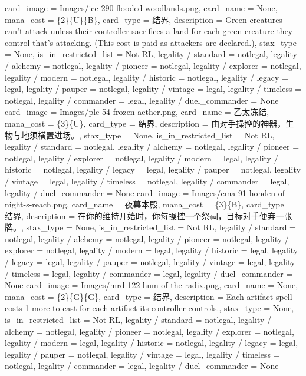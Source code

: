 \documentclass[lang = cn, color = black, 10pt]{AllThatStax}
\begin{document}
\card
{
	card_image = Images/ice-290-flooded-woodlands.png,
	card_name = None,
	mana_cost = \{2\}\{U\}\{B\},
	card_type = 结界,
	description = Green creatures can't attack unless their controller sacrifices a land for each green creature they control that's attacking. (This cost is paid as attackers are declared.),
	stax_type = None,
	is_in_restricted_list = Not RL,
	legality / standard = notlegal,
	legality / alchemy = notlegal,
	legality / pioneer = notlegal,
	legality / explorer = notlegal,
	legality / modern = notlegal,
	legality / historic = notlegal,
	legality / legacy = legal,
	legality / pauper = notlegal,
	legality / vintage = legal,
	legality / timeless = notlegal,
	legality / commander = legal,
	legality / duel_commander = None
}
\card
{
	card_image = Images/plc-54-frozen-aether.png,
	card_name = 乙太冻结,
	mana_cost = \{3\}\{U\},
	card_type = 结界,
	description = 由对手操控的神器，生物与地须横置进场。,
	stax_type = None,
	is_in_restricted_list = Not RL,
	legality / standard = notlegal,
	legality / alchemy = notlegal,
	legality / pioneer = notlegal,
	legality / explorer = notlegal,
	legality / modern = legal,
	legality / historic = notlegal,
	legality / legacy = legal,
	legality / pauper = notlegal,
	legality / vintage = legal,
	legality / timeless = notlegal,
	legality / commander = legal,
	legality / duel_commander = None
}
\card
{
	card_image = Images/ema-91-honden-of-night-s-reach.png,
	card_name = 夜幕本殿,
	mana_cost = \{3\}\{B\},
	card_type = 结界,
	description = 在你的维持开始时，你每操控一个祭祠，目标对手便弃一张牌。,
	stax_type = None,
	is_in_restricted_list = Not RL,
	legality / standard = notlegal,
	legality / alchemy = notlegal,
	legality / pioneer = notlegal,
	legality / explorer = notlegal,
	legality / modern = legal,
	legality / historic = legal,
	legality / legacy = legal,
	legality / pauper = notlegal,
	legality / vintage = legal,
	legality / timeless = legal,
	legality / commander = legal,
	legality / duel_commander = None
}
\card
{
	card_image = Images/mrd-122-hum-of-the-radix.png,
	card_name = None,
	mana_cost = \{2\}\{G\}\{G\},
	card_type = 结界,
	description = Each artifact spell costs {1} more to cast for each artifact its controller controls.,
	stax_type = None,
	is_in_restricted_list = Not RL,
	legality / standard = notlegal,
	legality / alchemy = notlegal,
	legality / pioneer = notlegal,
	legality / explorer = notlegal,
	legality / modern = legal,
	legality / historic = notlegal,
	legality / legacy = legal,
	legality / pauper = notlegal,
	legality / vintage = legal,
	legality / timeless = notlegal,
	legality / commander = legal,
	legality / duel_commander = None
}
\end{document}
